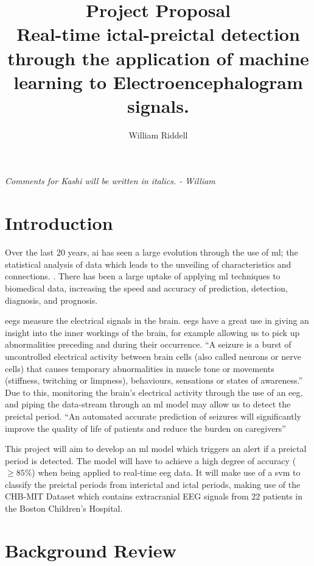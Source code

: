\documentclass[12pt]{article}
\title{Project Proposal \\ Real-time ictal-preictal detection through the application of machine learning to Electroencephalogram signals.}
\author{William Riddell}
\begin{document}
\maketitle

\textit{Comments for Kashi will be written in italics. - William}

\section{Introduction}

Over the last 20 years, \acrfull{ai} has seen a large evolution through the use of \acrfull{ml}; the statistical analysis of data which leads to the unveiling of characteristics and connections. \cite{awad2015efficient}. There has been a large uptake of applying \acrshort{ml} techniques to biomedical data, increasing the speed and accuracy of prediction, detection, diagnosis, and prognosis. 

\acrfull{eegs} measure the electrical signals in the brain. \acrshort{eegs} have a great use in giving an insight into the inner workings of the brain, for example allowing us to pick up abnormalities preceding and during their occurrence. ``A seizure is a burst of uncontrolled electrical activity between brain cells (also called neurons or nerve cells) that causes temporary abnormalities in muscle tone or movements (stiffness, twitching or limpness), behaviours, sensations or states of awareness.'' \cite{johnHopkinsTypesOfSeizures} Due to this, monitoring the brain's electrical activity through the use of an \acrshort{eeg}, and piping the data-stream through an \acrshort{ml} model may allow us to detect the preictal period. ``An automated accurate prediction of seizures will significantly improve the quality of life of patients and reduce the burden on caregivers'' \cite{acharya2018automated}

This project will aim to develop an \acrshort{ml} model which triggers an alert if a preictal period is detected. The model will have to achieve a high degree of accuracy ($\geq85\%$) when being applied to real-time \acrshort{eeg} data. It will make use of a \acrfull{svm} to classify the preictal periods from interictal and ictal periods, making use of the CHB-MIT Dataset which contains extracranial EEG signals from 22 patients in the Boston Children's Hospital. \cite{shoeb2009application} \cite{PhysioNet}


\section{Background Review}
\end{document}

